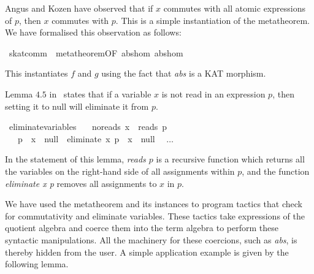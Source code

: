 \documentclass{llncs}
\begin{document}
Angus and Kozen have observed that if $x$ commutes with all atomic
expressions of $p$, then $x$ commutes with $p$. This is a simple
instantiation of the metatheorem.  We have formalised this observation
as follows:

\begin{isabellebody}
\isanewline
{}\isamarkupfalse%
\ skat{}comm\ {}\ metatheorem{}OF\ abs{}hom\ abs{}hom{}\isanewline
\end{isabellebody}

\noindent This instantiates $f$ and $g$ using the fact that
\textit{abs} is a KAT morphism.

Lemma $4.5$ in~\cite{Angus} states that if a variable $x$ is not read in an
expression $p$, then setting it to null will eliminate it from $p$.

\begin{isabellebody}
\isanewline
{}\isamarkupfalse%
\ eliminate{}variables{}\isanewline
\ \ \ no{}reads{}\ {}x\ {}\ reads\ p{}\isanewline
\ \ \ {}{}p{}\ {}\ x\ {}{}\ null\ {}\ {}eliminate\ x\ p{}\ {}\ x\ {}{}\ null{}\isanewline
\ \ $\dots$\isanewline
\end{isabellebody}

\noindent In the statement of this lemma, \textit{reads $p$} is a
recursive function which returns all the variables on the right-hand
side of all assignments within $p$, and the function \textit{eliminate
  x p} removes all assignments to $x$ in $p$.

We have used the metatheorem and its instances to program tactics that
check for commutativity and eliminate variables. These tactics take
expressions of the quotient algebra and coerce them into the term
algebra to perform these syntactic manipulations. All the machinery
for these coercions, such as \textit{abs}, is thereby hidden
from the user. A simple application example is given by the following lemma.
\end{document}
